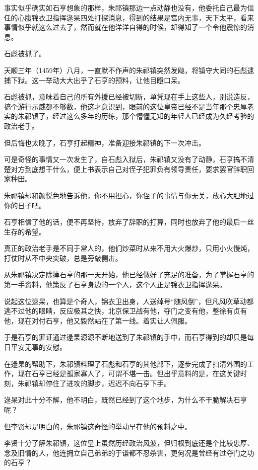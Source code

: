 \begin{multicols}{\theparacolNo}
事实似乎确实如石亨想象的那样，朱祁镇那边一点动静也没有，他委托自己最为信任的心腹锦衣卫指挥逯杲四处打探消息，得到的结果是宫内无事，天下太平，看来事情似乎就这么过去了，然而就在他洋洋自得的时候，却得知了一个令他震惊的消息。

石彪被抓了。

天顺三年（1459年）八月，一直默不作声的朱祁镇突然发飚，将镇守大同的石彪逮捕下狱。这一举动大大出乎了石亨的预料，让他目瞪口呆。

石彪被抓，意味着自己的所有外援已经被切断，单凭现在手上这些人，别说造反，搞个游行示威都不够数，他这才意识到，眼前的这位皇帝已经不是当年那个忠厚老实的朱祁镇了，经过这么多年的历练，那个懵懂无知的年轻人已经成为久经考验的政治老手。

但后悔也太晚了，石亨打起精神，准备迎接朱祁镇的下一次冲击。

可是奇怪的事情又一次发生了，自石彪入狱后，朱祁镇又没有了动静，石亨搞不清楚对方到底想干什么，便上书表示自己对侄子犯罪负有领导责任，要求罢官辞职回家种田。

朱祁镇却和颜悦色地告诉他，你不用担心，你侄子的事情与你无关，放心大胆地过你的日子吧。

石亨相信了他的话，便不再坚持，放弃了辞职的打算，同时也放弃了他的最后一丝生存的希望。

真正的政治老手是不同于常人的，他们炒菜时从来不用大火爆炒，只用小火慢炖，打仗时从不中央突破，总是旁敲侧击。

从朱祁镇决定除掉石亨的那一天开始，他已经做好了充足的准备，为了掌握石亨的第一手资料，他策反了石亨身边的一个人，这个人正是锦衣卫指挥逯杲。

说起这位逯杲，也算是个奇人，锦衣卫出身，人送绰号“随风倒”，但凡风吹草动都逃不过他的眼睛，反应极其之快，北京保卫战有他，夺门之变有他，整徐有贞有他，现在对付石亨，他又毅然站在了第一线。着实让人佩服。

于是石亨的罪证通过逯杲源源不断地送到了朱祁镇的手中，而石亨得到的却只是每日平安无事的安慰。

在逯杲的帮助下，朱祁镇料理了石彪和石亨的其他部下，逐步完成了扫清外围的工作，现在石亨已经是孤家寡人了，可谓不堪一击。但出乎意料的是，在这关键时刻，朱祁镇却停住了进攻的脚步，迟迟不向石亨下手。

逯杲对此十分不解，他不明白，既然已经到了这个地步，为什么不干脆解决石亨呢？

但李贤却是明白的，朱祁镇这奇怪的举动早在他的预料之中。

李贤十分了解朱祁镇，这位皇上虽然历经政治风波，但归根到底还是个比较忠厚、念及旧情的人，他连拥立自己弟弟的于谦都不忍杀害，更何况是曾经有过夺门之功的石亨？


\end{multicols}
